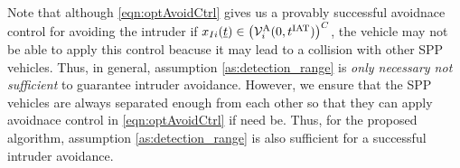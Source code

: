 Note that although \eqref{eqn:optAvoidCtrl} gives us a provably successful avoidnace control for avoiding the intruder if $x_{I i}(\underline{t}) \in \left(\mathcal{V}^{\text{A}}_{i}(0, t^\text{IAT})\right)^C$, the vehicle may not be able to apply this control beacuse it may lead to a collision with other SPP vehicles. Thus, in general, assumption \ref{as:detection_range} is \textit{only necessary not sufficient} to guarantee intruder avoidance. However, we ensure that the SPP vehicles are always separated enough from each other so that they can apply avoidnace control in \eqref{eqn:optAvoidCtrl} if need be. Thus, for the proposed algorithm, assumption \ref{as:detection_range} is also sufficient for a successful intruder avoidance.
